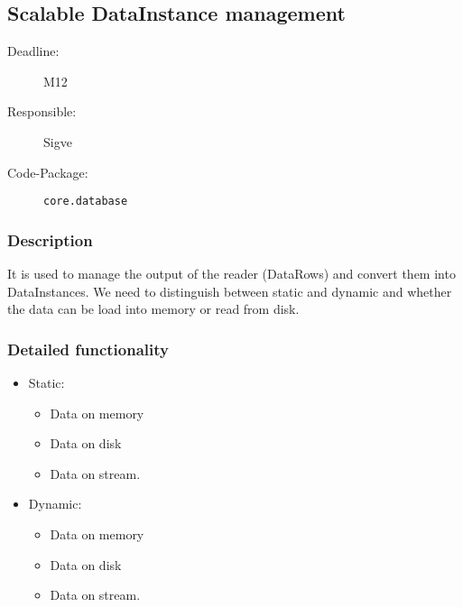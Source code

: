 \subsection{Scalable DataInstance management}
\label{ScalableDataInstanceManagement:ID}

\begin{description}
\item[Deadline:] M12
\item[Responsible:] Sigve
\item[Code-Package:] \texttt{core.database}
\end{description}

\subsubsection*{Description}

It is used to manage the output of the reader (DataRows) and convert them into DataInstances. We need to distinguish between static and dynamic and whether the data can be load into memory or read from disk.

\subsubsection*{Detailed functionality}

\begin{itemize}
\item Static:

\begin{itemize}
\item Data on memory
\item Data on disk
\item Data on stream.
\end{itemize}
\item Dynamic:
\begin{itemize}
\item Data on memory
\item Data on disk
\item Data on stream.
\end{itemize}
\end{itemize}